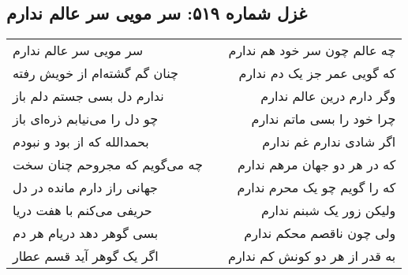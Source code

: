 \begin{center}
\section*{غزل شماره ۵۱۹: سر مویی سر عالم ندارم}
\label{sec:519}
\begin{longtable}{l p{0.5cm} r}
سر مویی سر عالم ندارم
&&
چه عالم چون سر خود هم ندارم
\\
چنان گم گشته‌ام از خویش رفته
&&
که گویی عمر جز یک دم ندارم
\\
ندارم دل بسی جستم دلم باز
&&
وگر دارم درین عالم ندارم
\\
چو دل را می‌نیابم ذره‌ای باز
&&
چرا خود را بسی ماتم ندارم
\\
بحمدالله که از بود و نبودم
&&
اگر شادی ندارم غم ندارم
\\
چه می‌گویم که مجروحم چنان سخت
&&
که در هر دو جهان مرهم ندارم
\\
جهانی راز دارم مانده در دل
&&
که را گویم چو یک محرم ندارم
\\
حریفی می‌کنم با هفت دریا
&&
ولیکن زور یک شبنم ندارم
\\
بسی گوهر دهد دریام هر دم
&&
ولی چون ناقصم محکم ندارم
\\
اگر یک گوهر آید قسم عطار
&&
به قدر از هر دو کونش کم ندارم
\\
\end{longtable}
\end{center}
